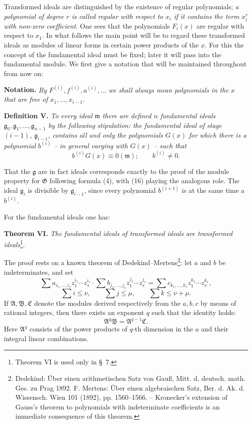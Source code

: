 \documentclass[11pt]{article}
\providecommand{\Amod}{\mathfrak A}
\providecommand{\Bmod}{\mathfrak B}
\providecommand{\Gmod}{\mathfrak G}
\providecommand{\mideal}{\mathfrak m}
\providecommand{\gideal}{\mathfrak g}
\providecommand{\zero}[1]{\equiv 0(#1)}
\providecommand{\Amod}{\mathfrak A}
\providecommand{\Bmod}{\mathfrak B}
\providecommand{\Gmod}{\mathfrak G}
\providecommand{\mideal}{\mathfrak m}
\providecommand{\gideal}{\mathfrak g}
\providecommand{\zero}[1]{\equiv 0\pmod{#1}}
\begin{document}
Transformed ideals are distinguished by the existence of regular polynomials; \emph{a polynomial of degree $r$ is called regular with respect to $x_i$ if it contains the term $x_i^r$ with non-zero coefficient}. One sees that the polynomials $F_i(x)$ are regular with respect to $x_1$. In what follows the main point will be to regard these transformed ideals as modules of linear forms in certain power products of the $x$. For this the concept of the fundamental ideal must be fixed; later it will pass into the fundamental module. We first give a notation that will be maintained throughout from now on:

\medskip
\noindent\textbf{Notation.} \emph{By $F^{(i)},f^{(i)},a^{(i)},\ldots$ we shall always mean polynomials in the $x$ that are free of $x_1,\ldots,x_{i-1}$.}

\medskip
\noindent\textbf{Definition V.} \emph{To every ideal $\mideal$ there are defined $n$ fundamental ideals $\gideal_0,\gideal_1,\ldots,\gideal_{n-1}$ by the following stipulation: the fundamental ideal of stage $(i-1)$, $\gideal_{i-1}$, contains all and only the polynomials $G(x)$ for which there is a polynomial $b^{(i)}$ -- in general varying with $G(x)$ -- such that}
\begin{equation}
 b^{(i)}G(x)\zero{\mideal};\qquad b^{(i)}\ne0.
\tag{16}
\end{equation}

That the $\gideal$ are in fact ideals corresponds exactly to the proof of the module property for $\Gmod$ following formula (4), with (16) playing the analogous role. The ideal $\gideal_i$ is divisible by $\gideal_{i-1}$, since every polynomial $b^{(i+1)}$ is at the same time a $b^{(i)}$.

For the fundamental ideals one has:

\medskip
\noindent\textbf{Theorem VI.} \emph{The fundamental ideals of transformed ideals are transformed ideals}\footnote{Theorem VI is used only in §~7.}.

The proof rests on a known theorem of Dedekind--Mertens\footnote{Dedekind: Über einen arithmetischen Satz von Gauß, Mitt. d. deutsch. math. Ges. zu Prag 1892. F. Mertens: Über einen algebraischen Satz, Ber. d. Ak. d. Wissensch. Wien 101 (1892), pp. 1560--1566. -- Kronecker's extension of Gauss's theorem to polynomials with indeterminate coefficients is an immediate consequence of this theorem.}: let $a$ and $b$ be indeterminates, and set
\[
 \sum a_{i_1,\ldots,i_s}z_1^{i_1}\cdots z_s^{i_s}\cdot
 \sum b_{j_1,\ldots,j_s}z_1^{j_1}\cdots z_s^{j_s}
 =
 \sum c_{k_1,\ldots,k_s}z_1^{k_1}\cdots z_s^{k_s},
\]
\[
 \sum i\le \nu,
 \qquad
 \sum j\le \mu,
 \qquad
 \sum k\le \nu+\mu.
\]
If $\Amod,\Bmod,\mathfrak C$ denote the modules derived respectively from the $a,b,c$ by means of rational integers, then there exists an exponent $q$ such that the identity holds:
\begin{equation}
 \Amod^q\Bmod=\Amod^{q-1}\mathfrak C.
\tag{17}
\end{equation}
Here $\Amod^q$ consists of the power products of $q$-th dimension in the $a$ and their integral linear combinations.
\end{document}
